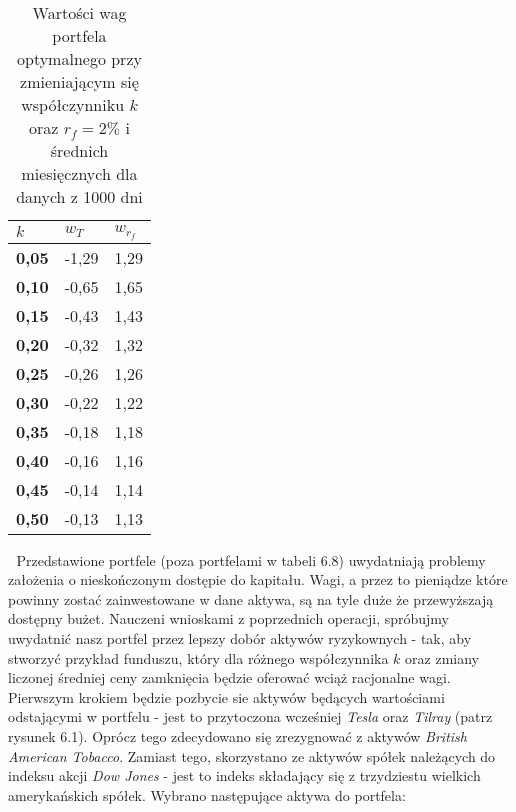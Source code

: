 \documentclass[magister]{dyplom}
\begin{document}
\begin{table}[ht]
	\centering
	\caption{Wartości wag portfela optymalnego przy zmieniającym się współczynniku $k$ oraz $r_f = 2\%$ i średnich miesięcznych dla danych z 1000 dni}
	\begin{tabular}{|l|l|l|}
		\hline
		\textbf{$k$} & \textbf{$w_T$} & \textbf{$w_{r_f}$} \\ \hline
		\textbf{0,05}                                             & -1,29         & 1,29           \\ \hline
		\textbf{0,10}                                             & -0,65         & 1,65           \\ \hline
		\textbf{0,15}                                             & -0,43         & 1,43           \\ \hline
		\textbf{0,20}                                             & -0,32         & 1,32           \\ \hline
		\textbf{0,25}                                             & -0,26         & 1,26           \\ \hline
		\textbf{0,30}                                             & -0,22         & 1,22           \\ \hline
		\textbf{0,35}                                             & -0,18         & 1,18           \\ \hline
		\textbf{0,40}                                             & -0,16         & 1,16           \\ \hline
		\textbf{0,45}                                             & -0,14         & 1,14           \\ \hline
		\textbf{0,50}                                             & -0,13         & 1,13           \\ \hline
	\end{tabular}
\end{table}
\newpage
\textcolor{white}{.}
\newpage
Przedstawione portfele (poza portfelami w tabeli 6.8) uwydatniają problemy założenia o nieskończonym dostępie do kapitału.\cite{simplifiedmarkowitz} Wagi, a przez to pieniądze które powinny zostać zainwestowane w dane aktywa, są na tyle duże że przewyższają dostępny bużet.
Nauczeni wnioskami z poprzednich operacji, spróbujmy uwydatnić nasz portfel przez lepszy dobór aktywów ryzykownych - tak, aby stworzyć przykład funduszu, który dla różnego współczynnika $k$ oraz zmiany liczonej średniej ceny zamknięcia będzie oferować wciąż racjonalne wagi. Pierwszym krokiem będzie pozbycie sie aktywów będących wartościami odstającymi w portfelu - jest to przytoczona wcześniej \textit{Tesla} oraz \textit{Tilray} (patrz rysunek 6.1). Oprócz tego zdecydowano się zrezygnować z aktywów \textit{British American Tobacco}. Zamiast tego, skorzystano ze aktywów spółek należących do indeksu akcji \textit{Dow Jones} - jest to indeks składający się z trzydziestu wielkich amerykańskich spółek. Wybrano następujące aktywa do portfela:
\end{document}
